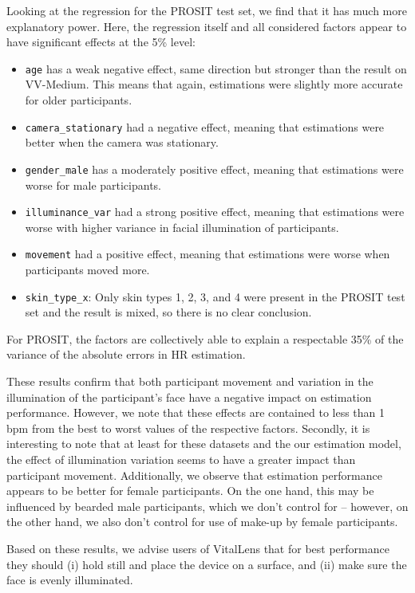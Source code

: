 \documentclass{article}
\begin{document}
Looking at the regression for the PROSIT test set, we find that it has much more explanatory power.
Here, the regression itself and all considered factors appear to have significant effects at the 5\% level: 

\begin{itemize}
	\item \texttt{age} has a weak negative effect, same direction but stronger than the result on VV-Medium. This means that again, estimations were slightly more accurate for older participants.
	\item \texttt{camera\_stationary} had a negative effect, meaning that estimations were better when the camera was stationary.
	\item \texttt{gender\_male} has a moderately positive effect, meaning that estimations were worse for male participants.
	\item \texttt{illuminance\_var} had a strong positive effect, meaning that estimations were worse with higher variance in facial illumination of participants.
	\item \texttt{movement} had a positive effect, meaning that estimations were worse when participants moved more.
	\item \texttt{skin\_type\_x}: Only skin types 1, 2, 3, and 4 were present in the PROSIT test set and the result is mixed, so there is no clear conclusion.
\end{itemize}

For PROSIT, the factors are collectively able to explain a respectable 35\% of the variance of the absolute errors in HR estimation.

These results confirm that both participant movement and variation in the illumination of the participant's face have a negative impact on estimation performance.
However, we note that these effects are contained to less than 1 bpm from the best to worst values of the respective factors.
Secondly, it is interesting to note that at least for these datasets and the our estimation model, the effect of illumination variation seems to have a greater impact than participant movement.
Additionally, we observe that estimation performance appears to be better for female participants.
On the one hand, this may be influenced by bearded male participants, which we don't control for -- however, on the other hand, we also don't control for use of make-up by female participants.

Based on these results, we advise users of VitalLens that for best performance they should (i) hold still and place the device on a surface, and (ii) make sure the face is evenly illuminated.
\end{document}
